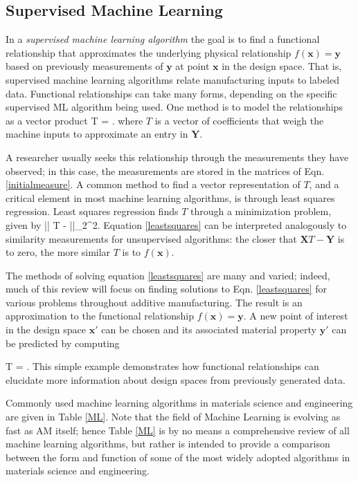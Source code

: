 \subsection{Supervised Machine Learning}
In a \textit{supervised machine learning algorithm} the goal is to find a functional relationship that approximates the underlying physical relationship $f(\mathbf{x}) = \mathbf{y}$ based on previously measurements of $\mathbf{y}$ at point $\mathbf{x}$ in the design space. That is, supervised machine learning algorithms relate manufacturing inputs to labeled data. Functional relationships can take many forms, depending on the specific supervised ML algorithm being used. One method is to model the relationships as a vector product 
\eqn
{}T = .
\label{map}
\equ
where $T$ is a vector of coefficients that weigh the machine inputs to approximate an entry in $\mathbf{Y}$. 

A researcher usually seeks this relationship through the measurements they have observed; in this case, the measurements are stored in the matrices of Eqn. \ref{initialmeasure}.
A common method to find a vector representation of $T$, and a critical element in most machine learning algorithms, is through least squares regression. Least squares regression finds $T$ through a minimization problem, given by
\eqn
\min || T -  ||_{2}^{2}.
\label{leastsquares}
\equ
Equation \ref{leastsquares} can be interpreted analogously to similarity measurements for unsupervised algorithms: the closer that $\mathbf{X}T - \mathbf{Y}$ is to zero, the more similar $T$ is to $f(\mathbf{x})$.

The methods of solving equation \ref{leastsquares} are many and varied; indeed, much of this review will focus on finding solutions to Eqn. \ref{leastsquares} for various problems throughout additive manufacturing.
The result is an approximation to the functional relationship $f(\mathbf{x}) = \mathbf{y}$.
A new point of interest in the design space $\mathbf{x'}$ can be chosen and its associated material property $\mathbf{y'}$ can be predicted by computing

\eqn
{}T = .
\equ
This simple example demonstrates how functional relationships can elucidate more information about design spaces from previously generated data.

Commonly used machine learning algorithms in materials science and engineering are given in Table \ref{ML}.
Note that the field of Machine Learning is evolving as fast as AM itself; hence Table \ref{ML} is by no means a comprehensive review of all machine learning algorithms, but rather is intended to provide a comparison between the form and function of some of the most widely adopted algorithms in materials science and engineering.

